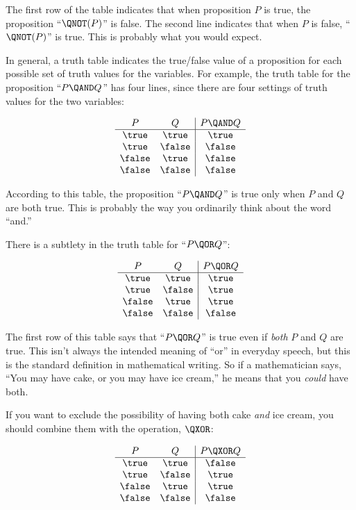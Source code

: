 The first row of the table indicates that when proposition $P$ is true,
the proposition ``$\QNOT(P)$'' is false.  The second line indicates that
when $P$ is false, ``$\QNOT(P)$'' is true.  This is probably what you
would expect.

In general, a truth table indicates the true/false value of a proposition
for each possible set of truth values for the variables.  For example, the
truth table for the proposition ``$P \QAND Q$'' has four lines, since
there are four settings of truth values for the two variables:

\[
\begin{array}{cc|c}
P & Q & P \QAND Q \\ \hline
\true & \true & \true \\
\true & \false & \false \\
\false & \true & \false \\
\false & \false & \false
\end{array}
\]

According to this table, the proposition ``$P \QAND Q$'' is true only when
$P$ and $Q$ are both true.  This is probably the way you ordinarily think
about the word ``and.''

There is a subtlety in the truth table for ``$P \QOR Q$'':

\[
\begin{array}{cc|c}
P & Q & P \QOR Q \\ \hline
\true & \true & \true \\
\true & \false & \true \\
\false & \true & \true \\
\false & \false & \false
\end{array}
\]

The first row of this table says that ``$P \QOR Q$'' is true even if
\textit{both} $P$ and $Q$ are true.  This isn't always the intended
meaning of ``or'' in everyday speech, but this is the standard definition
in mathematical writing.  So if a mathematician says, ``You may have cake,
or you may have ice cream,'' he means that you \textit{could} have both.

If you want to exclude the possibility of having both cake \emph{and}
ice cream, you should combine them with the 
operation, $\QXOR$:

\[\begin{array}{cc|c}
P & Q & P \QXOR Q \\ \hline
\true & \true & \false \\
\true & \false & \true \\
\false & \true & \true \\
\false & \false & \false
\end{array}
\]

